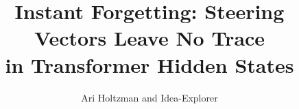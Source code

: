 \documentclass{article}
\title{Instant Forgetting: Steering Vectors Leave No Trace \\ in Transformer Hidden States}
\author{
  Ari Holtzman and Idea-Explorer
}
\begin{document}
\maketitle

\begin{abstract}

\end{abstract}










\end{document}
